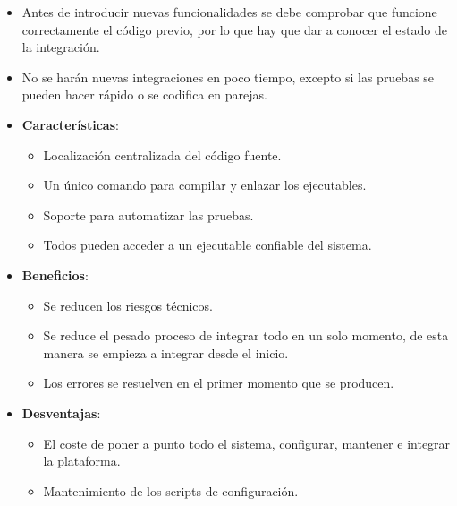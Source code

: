 \documentclass[12pt, twoside, openright]{report} %
\begin{document}
\begin{itemize}
  \begin{itemize}
  \item Antes de introducir nuevas funcionalidades se debe comprobar que
    funcione correctamente el código previo, por lo que hay que dar a
    conocer el estado de la integración.
    
  \item No se harán nuevas integraciones en poco tiempo, excepto si las
    pruebas se pueden hacer rápido o se codifica en parejas.
    
  \item \textbf{Características}:
    

    \begin{itemize}
    \item Localización centralizada del código fuente.
      
    \item Un único comando para compilar y enlazar los ejecutables.
      
    \item Soporte para automatizar las pruebas.
      
    \item Todos pueden acceder a un ejecutable confiable del sistema.
      
    \end{itemize}
  \item \textbf{Beneficios}:
    

    \begin{itemize}
    \item Se reducen los riesgos técnicos.
      
    \item Se reduce el pesado proceso de integrar todo en un solo momento,
      de esta manera se empieza a integrar desde el inicio.
      
    \item Los errores se resuelven en el primer momento que se producen.
      
    \end{itemize}
  \item \textbf{Desventajas}:
    

    \begin{itemize}
    \item El coste de poner a punto todo el sistema, configurar, mantener e
      integrar la plataforma.
      
    \item Mantenimiento de los scripts de configuración.
      

\end{itemize}
\end{itemize}
\end{itemize}
\end{document}
